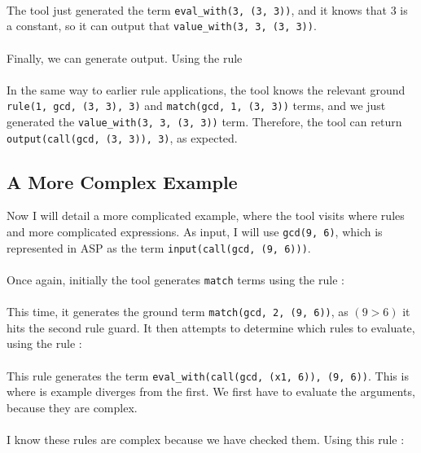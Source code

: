 
\mbox{} \\
The tool just generated the term \lstinline{eval_with(3, (3, 3))}, and it knows that 3 is a constant, so it can output that \lstinline{value_with(3, 3, (3, 3))}. \\ \\
Finally, we can generate output. Using the rule \\


\mbox{} \\
In the same way to earlier rule applications, the tool knows the relevant ground \lstinline{rule(1, gcd, (3, 3), 3)} and \lstinline{match(gcd, 1, (3, 3))} terms, and we just generated the \lstinline{value_with(3, 3, (3, 3))} term. Therefore, the tool can return \lstinline{output(call(gcd, (3, 3)), 3)}, as expected.

\subsection{A More Complex Example}
Now I will detail a more complicated example, where the tool visits where rules and more complicated expressions. As input, I will use \lstinline{gcd(9, 6)}, which is represented in ASP as the term \lstinline{input(call(gcd, (9, 6)))}. \\ \\
Once again, initially the tool generates \lstinline{match} terms using the rule : \\ %


\mbox{} \\
This time, it generates the ground term \lstinline{match(gcd, 2, (9, 6))}, as $(9 > 6)$ it hits the second rule guard. It then attempts to determine which rules to evaluate, using the rule : \\ %


\mbox{} \\
This rule generates the term \lstinline{eval_with(call(gcd, (x1, 6)), (9, 6))}. This is where is example diverges from the first. We first have to evaluate the arguments, because they are complex. \\ \\%
I know these rules are complex because we have checked them. Using this rule : \\


